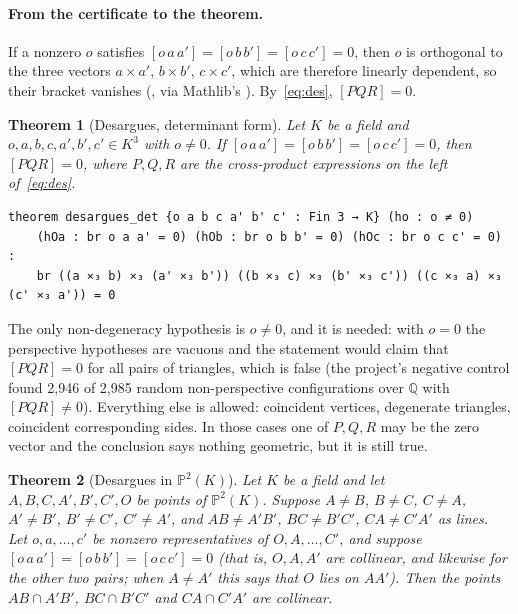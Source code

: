 \documentclass[11pt]{article}
\newtheorem{theorem}{Theorem}
\theoremstyle{definition}
\theoremstyle{remark}
\newcommand{\QQ}{\mathbb{Q}}
\newcommand{\PP}{\mathbb{P}}
\begin{document}
\paragraph{From the certificate to the theorem.} If a nonzero $o$ satisfies
$[o\,a\,a']=[o\,b\,b']=[o\,c\,c']=0$, then $o$ is orthogonal to the three vectors $a\times a'$, $b\times b'$, $c\times c'$, which are
therefore linearly dependent, so their bracket vanishes
(, via Mathlib's
). By~\eqref{eq:des}, $[PQR]=0$.

\begin{theorem}[Desargues, determinant form]\label{thm:desdet}
Let $K$ be a field and $o,a,b,c,a',b',c'\in K^3$ with $o\ne0$. If $[o\,a\,a']=[o\,b\,b']=[o\,c\,c']=0$,
then $[PQR]=0$, where $P,Q,R$ are the cross-product expressions on the left of~\eqref{eq:des}.
\end{theorem}

\begin{lstlisting}
theorem desargues_det {o a b c a' b' c' : Fin 3 → K} (ho : o ≠ 0)
    (hOa : br o a a' = 0) (hOb : br o b b' = 0) (hOc : br o c c' = 0) :
    br ((a ⨯₃ b) ⨯₃ (a' ⨯₃ b')) ((b ⨯₃ c) ⨯₃ (b' ⨯₃ c')) ((c ⨯₃ a) ⨯₃ (c' ⨯₃ a')) = 0
\end{lstlisting}

The only non-degeneracy hypothesis is $o\ne0$, and it is needed: with $o=0$ the perspective
hypotheses are vacuous and the statement would claim that $[PQR]=0$ for all pairs of
triangles, which is false (the project's negative control found 2{,}946 of 2{,}985 random
non-perspective configurations over $\QQ$ with $[PQR]\ne0$). Everything else is allowed:
coincident vertices, degenerate triangles, coincident corresponding sides. In those cases one of
$P,Q,R$ may be the zero vector and the conclusion says nothing geometric, but it is still true.

\begin{theorem}[Desargues in $\PP^2(K)$]\label{thm:desmk}
Let $K$ be a field and let $A,B,C,A',B',C',O$ be points of $\PP^2(K)$. Suppose $A\ne B$, $B\ne C$,
$C\ne A$, $A'\ne B'$, $B'\ne C'$, $C'\ne A'$, and $AB\ne A'B'$, $BC\ne B'C'$, $CA\ne C'A'$ as
lines. Let $o,a,\dots,c'$ be nonzero representatives of $O,A,\dots,C'$, and suppose
$[o\,a\,a']=[o\,b\,b']=[o\,c\,c']=0$ (that is, $O,A,A'$ are collinear, and likewise for the other
two pairs; when $A\ne A'$ this says that $O$ lies on $AA'$). Then the points $AB\cap A'B'$,
$BC\cap B'C'$ and $CA\cap C'A'$ are collinear.
\end{theorem}
\end{document}
